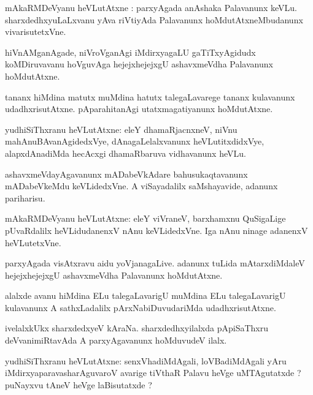 \documentclass{article}
\begin{document}
\begin{mn}
mAkaRMDeVyanu heVLutAtxne : parxyAgada anAshaka Palavanunx keVLu. sharxdedhxyuLaLxvanu yAva 
riVtiyAda Palavanunx hoMdutAtxneMbudanunx vivarisutetxVne.
\end{mn}

\begin{mn}
hiVnAMganAgade, niVroVganAgi iMdirxyagaLU gaTiTxyAgidudx koMDiruvavanu hoVguvAga hejejxhejejxgU 
ashavxmeVdha Palavanunx hoMdutAtxne.
\end{mn}

\begin{mn}

tananx hiMdina matutx muMdina hatutx talegaLavarege tananx kulavanunx udadhxrisutAtxne. 
pAparahitanAgi utatxmagatiyanunx hoMdutAtxne.
\end{mn}

\begin{mn}
yudhiSiThxranu heVLutAtxne: eleY dhamaRjacnxneV, niVnu mahAnuBAvanAgidedxVye, dAnagaLelalxvanunx 
heVLutitxdidxVye, alapxdAnadiMda hecAcxgi dhamaRbaruva vidhavanunx heVLu.
\end{mn}

\begin{mn}
ashavxmeVdayAgavanunx mADabeVkAdare bahusukaqtavanunx  mADabeVkeMdu keVLidedxVne. A viSayadalilx 
saMshayavide, adanunx pariharisu.
\end{mn}

\begin{mn}
mAkaRMDeVyanu heVLutAtxne: eleY viVraneV, barxhamxnu QuSigaLige pUvaRdalilx heVLidudanenxV nAnu 
keVLidedxVne. Iga nAnu ninage adanenxV heVLutetxVne.
\end{mn}


\begin{mn}
parxyAgada visAtxravu aidu yoVjanagaLive. adanunx tuLida mAtarxdiMdaleV hejejxhejejxgU ashavxmeVdha 
Palavanunx hoMdutAtxne.
\end{mn}

\begin{mn}
alalxde avanu hiMdina ELu talegaLavarigU muMdina ELu talegaLavarigU kulavanunx A sathxLadalilx 
pArxNabiDuvudariMda udadhxrisutAtxne.
\end{mn}

\begin{mn}
ivelalxkUkx sharxdedxyeV kAraNa. sharxdedhxyilalxda pApiSaThxru deVvanimiRtavAda A 
parxyAgavanunx hoMduvudeV ilalx.
\end{mn}

\begin{mn}
yudhiSiThxranu heVLutAtxne: senxVhadiMdAgali, loVBadiMdAgali yAru iMdirxyaparavasharAguvaroV 
avarige tiVthaR Palavu heVge uMTAgutatxde ? puNayxvu tAneV heVge laBisutatxde ?
\end{mn}
\end{document}
